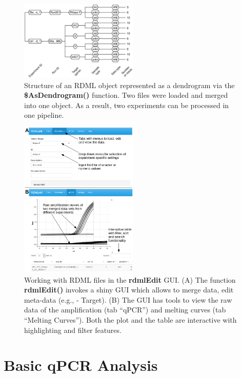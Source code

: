 \documentclass{bioinfo}
\begin{document}
\begin{figure}
\includegraphics[width=0.5\textwidth]{as_dendrogram.eps}
\caption{Structure of an RDML object represented as a dendrogram via the 
	\textbf{\$AsDendrogram()} function. Two files 
	were loaded and merged into one object. As a result, two 
	experiments can be processed in one pipeline.}\label{fig:01}
\end{figure}
\begin{figure}
\includegraphics[width=0.5\textwidth]{figure_gui.pdf}
\caption{Working with RDML files in the \textbf{rdmlEdit} GUI. 
  	(A) The function \textbf{rdmlEdit()} invokes a shiny GUI which allows to 
	merge data, edit meta-data (e.g., - Target). (B) The GUI has tools to view the raw 
	data of the amplification (tab ``qPCR'') and melting curves (tab ``Melting Curves''). Both the plot and 
	the table are interactive with highlighting and filter features.}\label{fig:02}
\end{figure}

\section{Basic qPCR Analysis}
\end{document}
